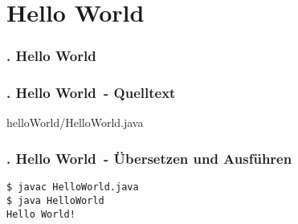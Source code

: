 \def\stitle{Hello World}
\section{\stitle}
\begin{frame}
  \frametitle{\kap. \stitle}%
\tableofcontents[current]
\end{frame}


\begin{frame}[fragile]%
  \frametitle{\kap. \stitle\ - Quelltext}%


{helloWorld/HelloWorld.java}
\end{frame}


\begin{frame}[fragile]%
  \frametitle{\kap. \stitle\ - \"Ubersetzen und Ausf\"uhren}%

\begin{lstlisting}[title={Um das Programm HelloWorld auszuf\"uhren werden folgende Schritte auf dem Terminal durchgef\"uhrt.},style=BASH]
$ javac HelloWorld.java
$ java HelloWorld
Hello World!
\end{lstlisting}
\end{frame}
